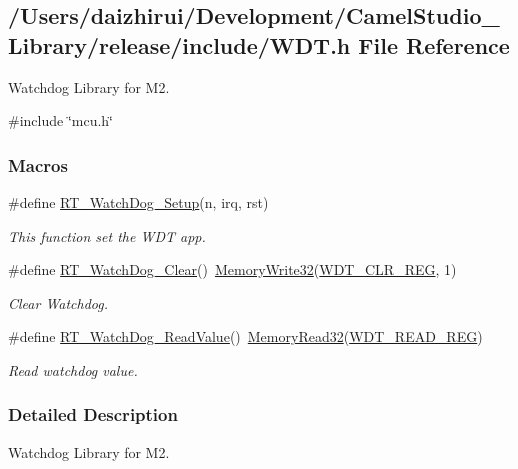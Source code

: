 \hypertarget{a00059}{}\subsection{/\+Users/daizhirui/\+Development/\+Camel\+Studio\+\_\+\+Library/release/include/\+W\+DT.h File Reference}
\label{a00059}


Watchdog Library for M2.  


{\ttfamily \#include \char`\"{}mcu.\+h\char`\"{}}\newline
\subsubsection*{Macros}
\begin{DoxyCompactItemize}
\item 
\#define \mbox{\hyperlink{a00059_a369b51538a0ccf57dcdb30e12352a8c7}{R\+T\+\_\+\+Watch\+Dog\+\_\+\+Setup}}(n,  irq,  rst)
\begin{DoxyCompactList}\small\item\em This function set the W\+DT app. \end{DoxyCompactList}\item 
\#define \mbox{\hyperlink{a00059_ae976b2fe76d4b216e68a771068434abc}{R\+T\+\_\+\+Watch\+Dog\+\_\+\+Clear}}()~\mbox{\hyperlink{a00020_a6b9732365b12e48ddb89fe1028b975b0}{Memory\+Write32}}(\mbox{\hyperlink{a00020_adadaa0ab1ebbd7ba9b70dfd24c3ed44dabca167e95871e42fa1108c2fd2cae6b3}{W\+D\+T\+\_\+\+C\+L\+R\+\_\+\+R\+EG}}, 1)
\begin{DoxyCompactList}\small\item\em Clear Watchdog. \end{DoxyCompactList}\item 
\#define \mbox{\hyperlink{a00059_acdfc8b8f0bddfd7382d49a22a92a5930}{R\+T\+\_\+\+Watch\+Dog\+\_\+\+Read\+Value}}()~\mbox{\hyperlink{a00020_a2d484dc15bdf30ee11ab3b05f31f0e16}{Memory\+Read32}}(\mbox{\hyperlink{a00020_adadaa0ab1ebbd7ba9b70dfd24c3ed44da91e0f7299a076e5fae19c026a579e1bb}{W\+D\+T\+\_\+\+R\+E\+A\+D\+\_\+\+R\+EG}})
\begin{DoxyCompactList}\small\item\em Read watchdog value. \end{DoxyCompactList}\end{DoxyCompactItemize}


\subsubsection{Detailed Description}
Watchdog Library for M2. 


